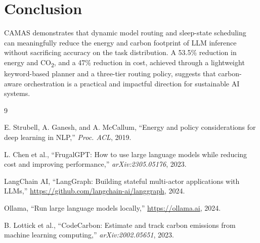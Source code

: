 \documentclass[conference]{IEEEtran}
\begin{document}
\section{Conclusion}

CAMAS demonstrates that dynamic model routing and sleep-state scheduling can
meaningfully reduce the energy and carbon footprint of LLM inference without
sacrificing accuracy on the task distribution. A 53.5\% reduction in energy and
CO\textsubscript{2}, and a 47\% reduction in cost, achieved through a
lightweight keyword-based planner and a three-tier routing policy, suggests
that carbon-aware orchestration is a practical and impactful direction for
sustainable AI systems.




\begin{thebibliography}{9}

E. Strubell, A. Ganesh, and A. McCallum,
``Energy and policy considerations for deep learning in NLP,''
\textit{Proc. ACL}, 2019.

L. Chen et al.,
``FrugalGPT: How to use large language models while reducing cost and
improving performance,''
\textit{arXiv:2305.05176}, 2023.

LangChain AI,
``LangGraph: Building stateful multi-actor applications with LLMs,''
\url{https://github.com/langchain-ai/langgraph}, 2024.

Ollama,
``Run large language models locally,''
\url{https://ollama.ai}, 2024.

B. Lottick et al.,
``CodeCarbon: Estimate and track carbon emissions from machine learning
computing,''
\textit{arXiv:2002.05651}, 2023.

\end{thebibliography}
\end{document}

